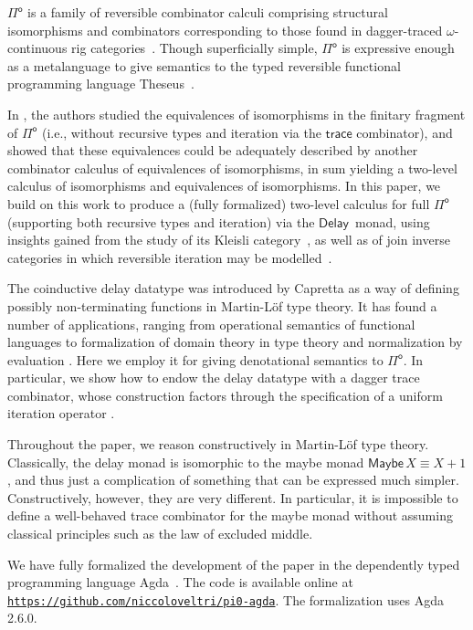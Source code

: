 \documentclass[runningheads,a4paper]{llncs}
\newcommand{\Pio}{\ensuremath{\mathsf{\Pi}^{\mathsf{o}}}}
\newcommand{\trace}{\ensuremath{\mathsf{trace}}}
\newcommand{\Delay}{\ensuremath{\mathsf{Delay}\,}}
\newcommand{\Maybe}{\mathsf{Maybe}}
\begin{document}
\Pio{} is a family of reversible combinator calculi comprising structural
isomorphisms and combinators corresponding to those found in dagger-traced
$\omega$-continuous rig categories~\cite{Karvonen19}. Though superficially
simple, \Pio{} is expressive enough as a metalanguage to give semantics to the
typed reversible functional programming language Theseus~\cite{JamesS14}.

In \cite{CaretteS16}, the authors studied the equivalences of isomorphisms in
the finitary fragment of \Pio{} (i.e., without recursive types and iteration
via the \trace{} combinator), and showed that these equivalences could be
adequately described by another combinator calculus of equivalences of
isomorphisms, in sum yielding a two-level calculus of isomorphisms and
equivalences of isomorphisms. In this paper, we build on this work to produce a
(fully formalized) two-level calculus for full \Pio{} (supporting both recursive
types and iteration) via the \Delay{} monad, using insights gained from the
study of its Kleisli category~\cite{UustaluV17,ChapmanUV19,VeltriPhD}, as well
as of join inverse categories in which reversible iteration may be
modelled~\cite{KaarsgaardAG17}.

The coinductive delay datatype was introduced by Capretta
\cite{Capretta05} as a way of defining possibly non-terminating
functions in Martin-L\"of type theory. It has found a number of
applications, ranging from operational semantics of functional
languages \cite{Danielsson12} to formalization of domain theory in
type theory \cite{BentonKV09} and normalization by evaluation
\cite{AbelC14}. Here we employ it for giving denotational semantics to
\Pio. In particular, we show how to endow the delay datatype with a
dagger trace combinator, whose construction factors through the
specification of a uniform iteration operator
\cite{GoncharovSRJ18,GoncharovMR16}.

Throughout the paper, we reason constructively in Martin-L\"of type
theory. Classically, the delay monad is isomorphic to the maybe monad
$\Maybe\,X \equiv X + 1$,
and thus just a complication of something that can be expressed much
simpler. Constructively, however, they are very different. In particular,
it is impossible to define a well-behaved trace combinator for the
maybe monad without assuming classical principles such as the law of
excluded middle.


We have fully formalized the development of the paper in the
dependently typed programming language Agda~\cite{Agda}. The code is
available online at \\ \texttt{\url{https://github.com/niccoloveltri/pi0-agda}}. The
formalization uses Agda 2.6.0.
\end{document}
